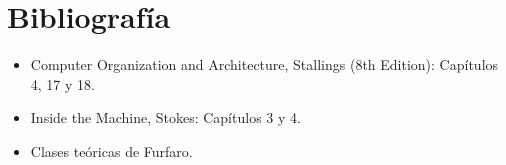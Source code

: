 \section{Bibliograf\'ia}
\begin{itemize}
 \item Computer Organization and Architecture, Stallings (8th Edition): Cap\'itulos 4, 17 y 18.
 
 \item Inside the Machine, Stokes: Cap\'itulos 3 y 4.

 \item Clases te\'oricas de Furfaro.
\end{itemize}
